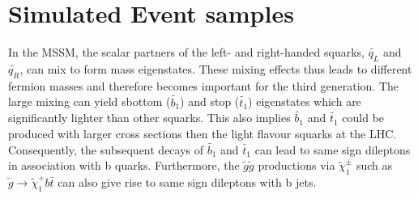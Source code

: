 \section{Simulated Event samples}
\label{sec:mcsignal}

In the MSSM, the scalar partners of the left- and right-handed squarks, $\tilde{q_L}$
and $\tilde{q_R}$, can mix to form mass eigenstates. These mixing effects thus leads to different fermion
masses and therefore becomes important for the third generation. The large mixing can yield sbottom ($\tilde{b_1}$)
and stop ($\tilde{t_1}$) eigenstates which are significantly lighter than other squarks. This also implies  $\tilde{b_1}$
and $\tilde{t_1}$ could be produced with larger cross sections then the light flavour squarks at the LHC. Consequently, 
the subsequent decays of $\tilde{b_1}$ and $\tilde{t_1}$ can lead to same sign dileptons in association with b quarks.
Furthermore, the $\tilde{g}\tilde{g}$ productions via $\tilde{\chi}^\pm_1$ such as $\tilde{g} \rightarrow \tilde{\chi}^{+}_{1} b \bar{t}$
can also give rise to same sign dileptons with b jets.

